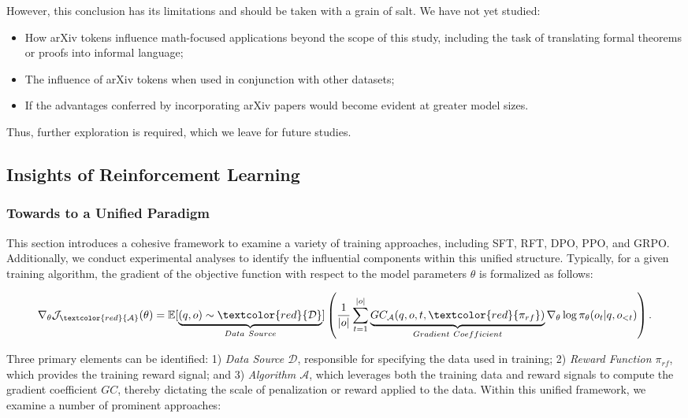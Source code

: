 \begin{itemize}[topsep=0pt]
\begin{itemize}[topsep=0pt]
However, this conclusion has its limitations and should be taken with a grain of salt. We have not yet studied:

\begin{itemize}[topsep=0pt]
    \item How arXiv tokens influence math-focused applications beyond the scope of this study, including the task of translating formal theorems or proofs into informal language;
    \item The influence of arXiv tokens when used in conjunction with other datasets;
    \item If the advantages conferred by incorporating arXiv papers would become evident at greater model sizes.
\end{itemize}

Thus, further exploration is required, which we leave for future studies.

\subsection{Insights of Reinforcement Learning}
\subsubsection{Towards to a Unified Paradigm} This section introduces a cohesive framework to examine a variety of training approaches, including SFT, RFT, DPO, PPO, and GRPO. Additionally, we conduct experimental analyses to identify the influential components within this unified structure. Typically, for a given training algorithm, the gradient of the objective function with respect to the model parameters $\theta$ is formalized as follows:

\begin{equation}
    \nabla_{\theta}\mathcal{J}_{\textcolor{red}{\mathcal{A}}}(\theta) = \mathbb{E}[\underbrace{(q,o) \sim \textcolor{red}{\mathcal{D}}}_{Data \ Source}]\left( \frac{1}{|o|} \sum_{t=1}^{|o|}  \underbrace{GC_{{\mathcal{A}}}(q, o, t, \textcolor{red}{\pi_{{rf}}})}_{Gradient \ Coefficient}  \nabla_{\theta}\log \pi_{\theta}(o_t | q, o_{<t})\right).
\label{eq:objective}
\end{equation}

Three primary elements can be identified: 1) \textit{Data Source $\mathcal{D}$}, responsible for specifying the data used in training; 2) \textit{Reward Function $\pi_{{rf}}$}, which provides the training reward signal; and 3) \textit{Algorithm $\mathcal{A}$}, which leverages both the training data and reward signals to compute the gradient coefficient $GC$, thereby dictating the scale of penalization or reward applied to the data. Within this unified framework, we examine a number of prominent approaches:


\end{itemize}
\end{itemize}
